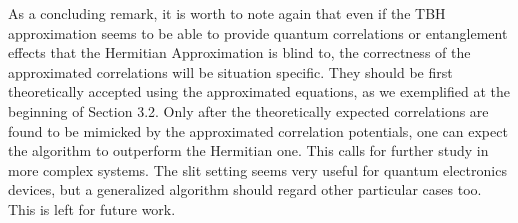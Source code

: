 \documentclass[11pt, a4paper]{article} %
\begin{document}
\vspace{+0.5cm}
As a concluding remark, it is worth to note again that even if the TBH approximation seems to be able to provide quantum correlations or entanglement effects that the Hermitian Approximation is blind to, the correctness of the approximated correlations will be situation specific. They should be first theoretically accepted using the approximated equations, as we exemplified at the beginning of Section 3.2. Only after the theoretically expected correlations are found to be mimicked by the approximated correlation potentials, one can expect the algorithm to outperform the Hermitian one. This calls for further study in more complex systems. The slit setting seems very useful for quantum electronics devices, but a generalized algorithm should regard other particular cases too. This is left for future work.











\end{document}
